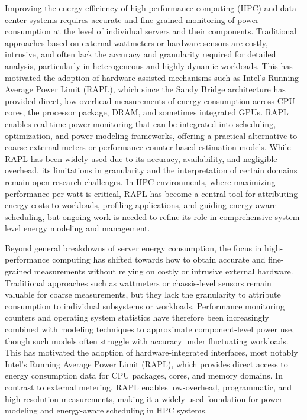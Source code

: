 Improving the energy efficiency of high-performance computing (HPC) and data center systems requires accurate and fine-grained monitoring of power consumption at the level of individual servers and their components. Traditional approaches based on external wattmeters or hardware sensors are costly, intrusive, and often lack the accuracy and granularity required for detailed analysis, particularly in heterogeneous and highly dynamic workloads. This has motivated the adoption of hardware-assisted mechanisms such as Intel’s Running Average Power Limit (RAPL), which since the Sandy Bridge architecture has provided direct, low-overhead measurements of energy consumption across CPU cores, the processor package, DRAM, and sometimes integrated GPUs. RAPL enables real-time power monitoring that can be integrated into scheduling, optimization, and power modeling frameworks, offering a practical alternative to coarse external meters or performance-counter-based estimation models. While RAPL has been widely used due to its accuracy, availability, and negligible overhead, its limitations in granularity and the interpretation of certain domains remain open research challenges. In HPC environments, where maximizing performance per watt is critical, RAPL has become a central tool for attributing energy costs to workloads, profiling applications, and guiding energy-aware scheduling, but ongoing work is needed to refine its role in comprehensive system-level energy modeling and management.

Beyond general breakdowns of server energy consumption, the focus in high-performance computing has shifted towards how to obtain accurate and fine-grained measurements without relying on costly or intrusive external hardware. Traditional approaches such as wattmeters or chassis-level sensors remain valuable for coarse measurements, but they lack the granularity to attribute consumption to individual subsystems or workloads. Performance monitoring counters and operating system statistics have therefore been increasingly combined with modeling techniques to approximate component-level power use, though such models often struggle with accuracy under fluctuating workloads. This has motivated the adoption of hardware-integrated interfaces, most notably Intel’s Running Average Power Limit (RAPL), which provides direct access to energy consumption data for CPU packages, cores, and memory domains. In contrast to external metering, RAPL enables low-overhead, programmatic, and high-resolution measurements, making it a widely used foundation for power modeling and energy-aware scheduling in HPC systems.

